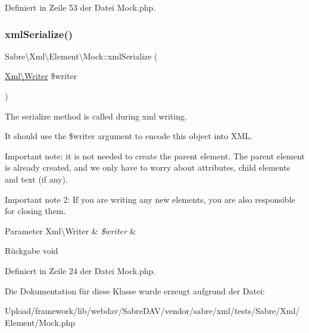 Definiert in Zeile 53 der Datei Mock.\+php.

\mbox{\label{class_sabre_1_1_xml_1_1_element_1_1_mock_aebc0b0e45033272c7a9f76f21973ef1e}} 
\subsubsection{\texorpdfstring{xml\+Serialize()}{xmlSerialize()}}
{\footnotesize\ttfamily Sabre\textbackslash{}\+Xml\textbackslash{}\+Element\textbackslash{}\+Mock\+::xml\+Serialize (\begin{DoxyParamCaption}\item[{\mbox{\hyperlink{class_sabre_1_1_xml_1_1_writer}{Xml\textbackslash{}\+Writer}}}]{\$writer }\end{DoxyParamCaption})}

The serialize method is called during xml writing.

It should use the \$writer argument to encode this object into X\+ML.

Important note\+: it is not needed to create the parent element. The parent element is already created, and we only have to worry about attributes, child elements and text (if any).

Important note 2\+: If you are writing any new elements, you are also responsible for closing them.


\begin{DoxyParams}[1]{Parameter}
Xml\textbackslash{}\+Writer & {\em \$writer} & \\
\hline
\end{DoxyParams}
\begin{DoxyReturn}{Rückgabe}
void 
\end{DoxyReturn}


Definiert in Zeile 24 der Datei Mock.\+php.



Die Dokumentation für diese Klasse wurde erzeugt aufgrund der Datei\+:\begin{DoxyCompactItemize}
\item 
Upload/framework/lib/webdav/\+Sabre\+D\+A\+V/vendor/sabre/xml/tests/\+Sabre/\+Xml/\+Element/Mock.\+php\end{DoxyCompactItemize}
